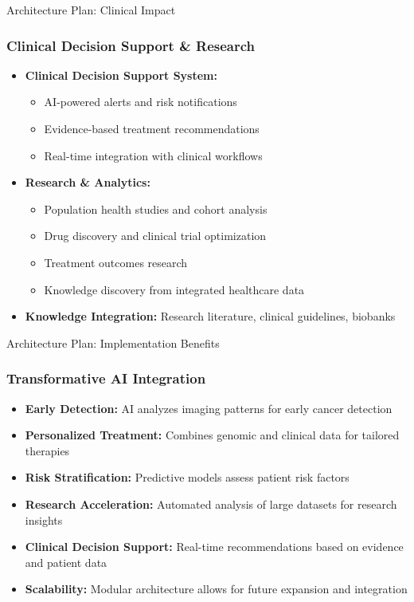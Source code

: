 \documentclass{beamer}
\begin{document}
\begin{frame}{Architecture Plan: Clinical Impact}
    \frametitle{Clinical Decision Support \& Research}
    \begin{itemize}
        \item \textbf{Clinical Decision Support System:}
        \begin{itemize}
            \item AI-powered alerts and risk notifications
            \item Evidence-based treatment recommendations
            \item Real-time integration with clinical workflows
        \end{itemize}
        \item \textbf{Research \& Analytics:}
        \begin{itemize}
            \item Population health studies and cohort analysis
            \item Drug discovery and clinical trial optimization
            \item Treatment outcomes research
            \item Knowledge discovery from integrated healthcare data
        \end{itemize}
        \item \textbf{Knowledge Integration:} Research literature, clinical guidelines, biobanks
    \end{itemize}
\end{frame}

\begin{frame}{Architecture Plan: Implementation Benefits}
    \frametitle{Transformative AI Integration}
    \begin{itemize}
        \item \textbf{Early Detection:} AI analyzes imaging patterns for early cancer detection
        \item \textbf{Personalized Treatment:} Combines genomic and clinical data for tailored therapies
        \item \textbf{Risk Stratification:} Predictive models assess patient risk factors
        \item \textbf{Research Acceleration:} Automated analysis of large datasets for research insights
        \item \textbf{Clinical Decision Support:} Real-time recommendations based on evidence and patient data
        \item \textbf{Scalability:} Modular architecture allows for future expansion and integration
    \end{itemize}
\end{frame}
\end{document}
